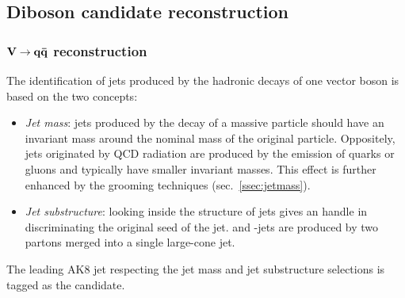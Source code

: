 \subsection{Diboson candidate reconstruction}
\label{ssec:final_dib_cand}

\subsubsection{$\mathbf{V \rightarrow q \bar{q}}$ reconstruction}
\label{ssec:Vcand}
The identification of jets produced by the hadronic decays of one vector boson is based on the two concepts:
\begin{itemize}
  \item \textit{Jet mass}: jets produced by the decay of a massive particle should have an invariant mass around the nominal mass of the original particle. Oppositely, jets originated by QCD radiation are produced by the emission of quarks or gluons and typically have smaller invariant masses. This effect is further enhanced by the grooming techniques (sec.~\ref{ssec:jetmass}).
  \item \textit{Jet substructure}: looking inside the structure of jets gives an handle in discriminating the original seed of the jet. \Z and \W-jets are produced by two partons merged into a single large-cone jet.
\end{itemize}

\noindent The leading AK8 jet respecting the jet mass and jet substructure selections is tagged as the \V candidate.

